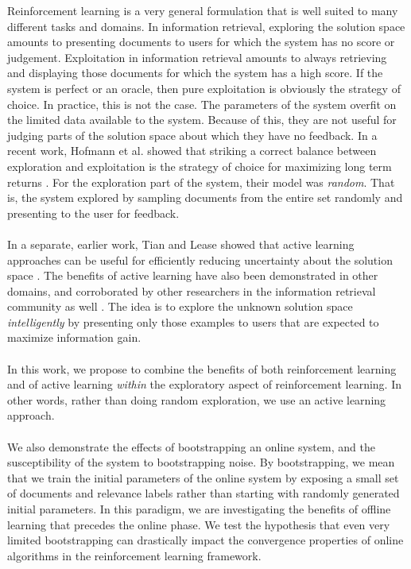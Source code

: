 \documentclass{acm_proc_article-sp}
\begin{document}
Reinforcement learning is a very general formulation that is well suited to many different tasks and domains. In information retrieval, exploring the solution space amounts to presenting documents to users for which the system has no score or judgement. Exploitation in information retrieval amounts to always retrieving and displaying those documents for which the system has a high score. If the system is perfect or an oracle, then pure exploitation is obviously the strategy of choice. In practice, this is not the case. The parameters of the system overfit on the limited data available to the system. Because of this, they are not useful for judging parts of the solution space about which they have no feedback. In a recent work, Hofmann et al. showed that striking a correct balance between exploration and exploitation is the strategy of choice for maximizing long term returns \cite{hofmann}. For the exploration part of the system, their model was \emph{random}. That is, the system explored by sampling documents from the entire set randomly and presenting to the user for feedback. \\ \\
In a separate, earlier work, Tian and Lease showed that active learning approaches can be useful for efficiently reducing uncertainty about the solution space \cite{aibo}. The benefits of active learning have also been demonstrated in other domains, and corroborated by other researchers in the information retrieval community as well \cite{active2}. The idea is to explore the unknown solution space \emph{intelligently} by presenting only those examples to users that are expected to maximize information gain. \\ \\
In this work, we propose to combine the benefits of both reinforcement learning and of active learning \emph{within} the exploratory aspect of reinforcement learning. In other words, rather than doing random exploration, we use an active learning approach. \\ \\
We also demonstrate the effects of bootstrapping an online system, and the susceptibility of the system to bootstrapping noise. By bootstrapping, we mean that we train the initial parameters of the online system by exposing a small set of documents and relevance labels rather than starting with randomly generated initial parameters. In this paradigm, we are investigating the benefits of offline learning that precedes the online phase. We test the hypothesis that even very limited bootstrapping can drastically impact the convergence properties of online algorithms in the reinforcement learning framework. 
\end{document}
